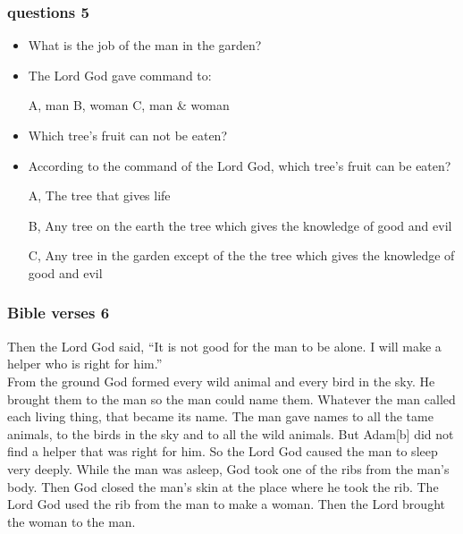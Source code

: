 \documentclass{beamer}
\begin{document}
\begin{frame}
\frametitle{questions 5}
\begin{itemize}
\item What is the job of the man in the garden?

\item The Lord God gave command to:

A, man    \hspace{1cm}          B, woman    \hspace{1cm}                   C, man & woman \hspace{1cm}   

\item Which tree's fruit can not be eaten?

\item According to the command of the Lord God, which tree's fruit can be eaten?

A, The tree that gives life

B, Any tree on the earth the tree which gives the knowledge of good and evil

C, Any tree in the garden except of the the tree which gives the knowledge of good and evil
\end{itemize}

\end{frame}




\begin{frame}
\frametitle{Bible verses 6}
Then the Lord God said, “It is not good for the man to be alone. I will make a helper who is right for him.”\\

From the ground God formed every wild animal and every bird in the sky. He brought them to the man so the man could name them. Whatever the man called each living thing, that became its name. The man gave names to all the tame animals, to the birds in the sky and to all the wild animals. But Adam[b] did not find a helper that was right for him.  So the Lord God caused the man to sleep very deeply. While the man was asleep, God took one of the ribs from the man’s body. Then God closed the man’s skin at the place where he took the rib.  The Lord God used the rib from the man to make a woman. Then the Lord brought the woman to the man.

\end{frame}
\end{document}
